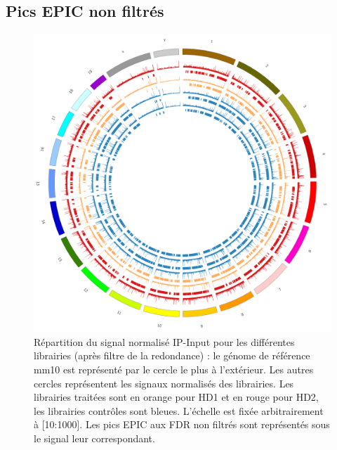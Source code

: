 \documentclass[a4paper,12pt,times]{report}
\newcommand{\scaption}[1]{\caption{\footnotesize{#1}}}
\begin{document}
\begin{appendices}
\clearpage
\section{Pics EPIC non filtrés}
  \begin{figure}[!h]
    \centering
    \includegraphics[scale=0.2]{circos2.png}
    \scaption{Répartition du signal normalisé IP-Input pour les différentes librairies (après filtre de la redondance) : le génome de référence mm10 est représenté par le cercle le plus à l'extérieur. Les autres cercles représentent les signaux normalisés des librairies. Les librairies traitées sont en orange pour HD1 et en rouge pour HD2, les librairies contrôles sont bleues.
    L'échelle est fixée arbitrairement à [10:1000]. Les pics EPIC aux FDR non filtrés sont représentés sous le signal leur correspondant. }
    \label{circosTout}
    \end{figure}

\newpage

\end{appendices}
\end{document}
